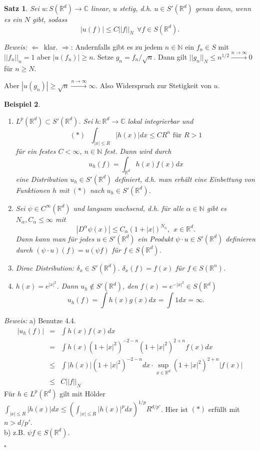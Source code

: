 \documentclass[12pt,a4paper,titlepage]{scrartcl}
\newtheorem{Satz}{Satz}[subsection]
\newtheorem{Beispiel}[Satz]{Beispiel}
\numberwithin{equation}{section}
\newcommand{\C}{\mathbb{C}} %
\newcommand{\R}{\mathbb{R}} %
\newcommand{\N}{\mathbb{N}} %
\newcommand{\m}{\cdot}
\newcommand{\Bew}{\emph{Beweis: }}
\newcommand{\qed}{\begin{flushright}
		$\square$
	\end{flushright}}
\begin{document}
	\begin{Satz}
		Sei $u:S(\R^d)\rightarrow \C$ linear, $u$ stetig, d.h. $u\in S'(\R^d)$ genau dann, wenn es ein $N$ gibt, sodass 
		$$|u(f)|\leq C||f||_N~~\forall f\in S(\R^d).$$
	\end{Satz}
	
	\Bew \glqq$\Leftarrow$\grqq\ klar. \glqq$\Rightarrow$\grqq: Andernfalls gibt es zu jedem $n\in \N$ ein $f_n\in S$ mit $||f_n||_n = 1$ aber $|u(f_n)|\geq n$. Setze $g_n = f_n/\sqrt{n}$. Dann gilt $||g_n||_N \leq n^{1/2}\overset{n\rightarrow\infty}{\rightarrow} 0$ für $n\geq N$.
	
	Aber $|u(g_n)|\geq \sqrt{n}\overset{n\rightarrow\infty}{\rightarrow}\infty$. Also Widerspruch zur Stetigkeit von $u$.
	
	
	\begin{Beispiel}
		~
		\begin{enumerate}
			\item[a)] \glqq$L^p(\R^d)\subset S'(\R^d)$\grqq. Sei $h:\R^d\rightarrow \C$ lokal integrierbar und
			$$(*)~~~\int_{|x|\leq R}|h(x)|dx\leq C R^n\text{ für } R> 1$$
			für ein festes $C<\infty$, $n\in \N$ fest. Dann wird durch 
			$$u_h(f)= \int_{\R^d} h(x)f(x)dx$$
			eine Distribution $u_h\in S'(\R^d)$ definiert, d.h. man erhält eine Einbettung von Funktionen $h$ mit $(*)$ nach $u_h\in S'(\R^d)$.
			\item[b)] Sei $\psi\in C^\infty(\R^d)$ und langsam wachsend, d.h. für alle $\alpha\in \N$ gibt es $N_\alpha, C_\alpha\leq \infty$ mit 
			$$|D^\alpha\psi(x)|\leq C_\alpha(1+|x|)^{N_\alpha},~~ x\in \R^d.$$
			Dann kann man für jedes $u\in S'(\R^d)$ ein Produkt $\psi\m u\in S'(\R^d)$ definieren durch $(\psi\m u)(f) = u(\psi f)$ für $f\in S(\R^d)$.
			\item[c)] Dirac Distribution: $\delta_x\in S'(\R^d)$. $\delta_x(f) = f(x)$ für $f\in S(\R^n)$.
			\item[d)] $h(x) = e^{|x|^2}$. Dann $u_h\notin S'(\R^d)$, den $f(x) = e^{-|x|^2}\in S(\R^d)$
			$$u_h(f)=\int h(x) g(x) dx = \int 1 dx = \infty.$$
		\end{enumerate}
	\end{Beispiel}
	\Bew a) Benutze 4.4. 
	\begin{eqnarray}
		|u_h(f)| &=& \int h(x)f(x)dx\nonumber\\
		&=& \int h(x)(1+|x|^2)^{-2-n}(1+|x|^2)^{2+n}f(x) dx \nonumber\\
		&\leq& \int |h(x)|(1+|x|^2)^{-2-n}dx\m \sup_{x\in \R^d}(1+|x|^2)^{2+n}|f(x)|\nonumber\\
		&\leq& C||f||_N\nonumber
	\end{eqnarray}
	Für $h\in L^p(\R^d)$ gilt mit Hölder $\int_{|x|\leq R}|h(x)|dx\leq \left(\int_{|x|\leq R}|h(x)|^p dx \right)^{1/p} R^{d/p'}$. Hier ist $(*)$ erfüllt mit $n>d/p'$.\\
	b) z.B. $\psi f\in S(\R^d)$.
	\qed
	
\end{document}
